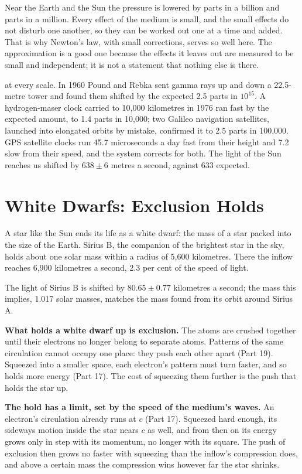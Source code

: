Near the Earth and the Sun the pressure is lowered by parts in a billion and parts in a million. Every effect of the medium is small, and the small effects do not disturb one another, so they can be worked out one at a time and added. That is why Newton's law, with small corrections, serves so well here. The approximation is a good one because the effects it leaves out are measured to be small and independent; it is not a statement that nothing else is there.

 at every scale. In 1960 Pound and Rebka sent gamma rays up and down a 22.5-metre tower and found them shifted by the expected 2.5 parts in $10^{15}$. A hydrogen-maser clock carried to 10,000 kilometres in 1976 ran fast by the expected amount, to 1.4 parts in 10,000; two Galileo navigation satellites, launched into elongated orbits by mistake, confirmed it to 2.5 parts in 100,000. GPS satellite clocks run 45.7 microseconds a day fast from their height and 7.2 slow from their speed, and the system corrects for both. The light of the Sun reaches us shifted by $638\pm6$ metres a second, against 633 expected.

\section{White Dwarfs: Exclusion Holds}

A star like the Sun ends its life as a white dwarf: the mass of a star packed into the size of the Earth. Sirius B, the companion of the brightest star in the sky, holds about one solar mass within a radius of 5,600 kilometres. There the inflow reaches 6,900 kilometres a second, 2.3 per cent of the speed of light.

 The light of Sirius B is shifted by $80.65\pm0.77$ kilometres a second; the mass this implies, 1.017 solar masses, matches the mass found from its orbit around Sirius A.

\begin{hypbar}
\textbf{What holds a white dwarf up is exclusion.} The atoms are crushed together until their electrons no longer belong to separate atoms. Patterns of the same circulation cannot occupy one place: they push each other apart (Part 19).\footnotemark{} Squeezed into a smaller space, each electron's pattern must turn faster, and so holds more energy (Part 17).\footnotemark{} The cost of squeezing them further is the push that holds the star up.

\textbf{The hold has a limit, set by the speed of the medium's waves.} An electron's circulation already runs at $c$ (Part 17). Squeezed hard enough, its sideways motion inside the star nears $c$ as well, and from then on its energy grows only in step with its momentum, no longer with its square. The push of exclusion then grows no faster with squeezing than the inflow's compression does, and above a certain mass the compression wins however far the star shrinks.
\end{hypbar}
\addtocounter{footnote}{-1}

